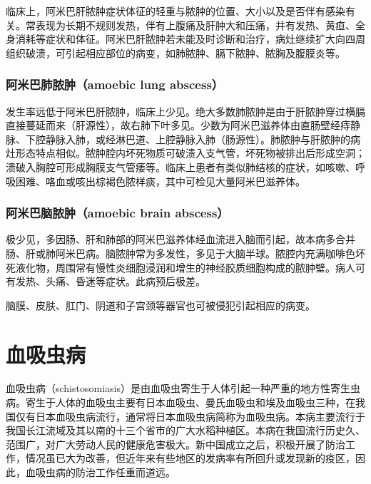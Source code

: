临床上，阿米巴肝脓肿症状体征的轻重与脓肿的位置、大小以及是否伴有感染有关。常表现为长期不规则发热，伴有上腹痛及肝肿大和压痛，并有发热、黄疸、全身消耗等症状和体征。阿米巴肝脓肿若未能及时诊断和治疗，病灶继续扩大向四周组织破溃，可引起相应部位的病变，如肺脓肿、膈下脓肿、脓胸及腹膜炎等。

\subsubsection{阿米巴肺脓肿（amoebic lung abscess）}

发生率远低于阿米巴肝脓肿，临床上少见。绝大多数肺脓肿是由于肝脓肿穿过横膈直接蔓延而来（肝源性），故右肺下叶多见。少数为阿米巴滋养体由直肠壁经痔静脉、下腔静脉入肺，或经淋巴道、上腔静脉入肺（肠源性）。肺脓肿与肝脓肿的病灶形态特点相似。脓肿腔内坏死物质可破溃入支气管，坏死物被排出后形成空洞；溃破入胸腔可形成胸膜支气管痿等。临床上患者有类似肺结核的症状，如咳嗽、呼吸困难、咯血或咳出棕褐色脓样痰，其中可检见大量阿米巴滋养体。

\subsubsection{阿米巴脑脓肿（amoebic brain abscess）}

极少见，多因肠、肝和肺部的阿米巴滋养体经血流进入脑而引起，故本病多合并肠、肝或肺阿米巴病。脑脓肿常为多发性，多见于大脑半球。脓腔内充满咖啡色坏死液化物，周围常有慢性炎细胞浸润和增生的神经胶质细胞构成的脓肿壁。病人可有发热、头痛、昏迷等症状。此病预后极差。

脑膜、皮肤、肛门、阴道和子宫颈等器官也可被侵犯引起相应的病变。

\section{血吸虫病}

血吸虫病（schistosomiasis）是由血吸虫寄生于人体引起一种严重的地方性寄生虫病。寄生于人体的血吸虫主要有日本血吸虫、曼氏血吸虫和埃及血吸虫三种，在我国仅有日本血吸虫病流行，通常将日本血吸虫病简称为血吸虫病。本病主要流行于我国长江流域及其以南的十三个省市的广大水稻种植区。本病在我国流行历史久、范围广，对广大劳动人民的健康危害极大。新中国成立之后，积极开展了防治工作，情况虽已大为改善，但近年来有些地区的发病率有所回升或发现新的疫区，因此，血吸虫病的防治工作任重而道远。

